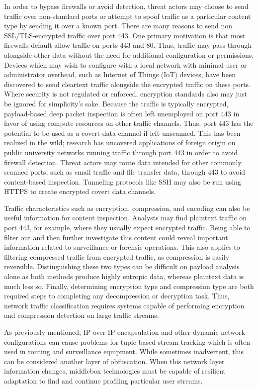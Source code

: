 In order to bypass firewalls or avoid detection, threat actors may choose to send traffic over non-standard ports or attempt to spoof traffic as a particular content type by sending it over a known port. There are many reasons to send non SSL/TLS-encrypted traffic over port 443. One primary motivation is that most firewalls default-allow traffic on ports 443 and 80. Thus, traffic may pass through alongside other data without the need for additional configuration or permissions. Devices which may wish to configure with a local network with minimal user or administrator overhead, such as Internet of Things (IoT) devices, have been discovered to send cleartext traffic alongside the encrypted traffic on these ports. Where security is not regulated or enforced, encryption standards also may just be ignored for simplicity's sake. Because the traffic is typically encrypted, payload-based deep packet inspection is often left unemployed on port 443 in favor of using compute resources on other traffic channels. Thus, port 443 has the potential to be used as a covert data channel if left unscanned. This has been realized in the wild; research has uncovered applications of foreign origin on public university networks running traffic through port 443 in order to avoid firewall detection. Threat actors may route data intended for other commonly scanned ports, such as email traffic and file transfer data, through 443 to avoid content-based inspection. Tunneling protocols like SSH may also be run using HTTPS to create encrypted covert data channels.

Traffic characteristics such as encryption, compression, and encoding can also be useful information for content inspection. Analysts may find plaintext traffic on port 443, for example, where they usually expect encrypted traffic. Being able to filter out and then further investigate this content could reveal important information related to surveillance or forensic operations. This also applies to filtering compressed traffic from encrypted traffic, as compression is easily reversible. Distinguishing these two types can be difficult on payload analysis alone as both methods produce highly entropic data, whereas plaintext data is much less so. Finally, determining encryption type and compression type are both required steps to completing any decompression or decryption task. Thus, network traffic classification requires systems capable of performing encryption and compression detection on large traffic streams.

As previously mentioned, IP-over-IP encapsulation and other dynamic network configurations can cause problems for tuple-based stream tracking which is often used in routing and surveillance equipment. While sometimes inadvertent, this can be considered another layer of obfuscation. When this network layer information changes, middlebox technologies must be capable of resilient adaptation to find and continue profiling particular user streams.

